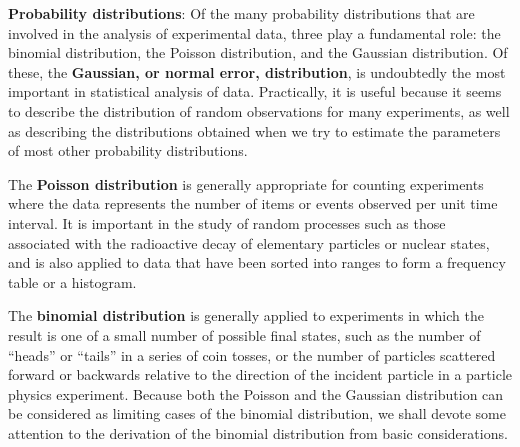 \documentclass[a4paper,10pt]{article}
\begin{document}
{\noindent}\textbf{Probability distributions}: Of the many probability distributions that are involved in the analysis of experimental data, three play a fundamental role: the binomial distribution, the Poisson distribution, and the Gaussian distribution. Of these, the \textbf{Gaussian, or normal error, distribution}, is undoubtedly the most important in statistical analysis of data. Practically, it is useful because it seems to describe the distribution of random observations for many experiments, as well as describing the distributions obtained when we try to estimate the parameters of most other probability distributions. 

{\noindent}The \textbf{Poisson distribution} is generally appropriate for counting experiments where the data represents the number of items or events observed per unit time interval. It is important in the study of random processes such as those associated with the radioactive decay of elementary particles or nuclear states, and is also applied to data that have been sorted into ranges to form a frequency table or a histogram. 

{\noindent}The \textbf{binomial distribution} is generally applied to experiments in which the result is one of a small number of possible final states, such as the number of ``heads'' or ``tails'' in a series of coin tosses, or the number of particles scattered forward or backwards relative to the direction of the incident particle in a particle physics experiment. Because both the Poisson and the Gaussian distribution can be considered as limiting cases of the binomial distribution, we shall devote some attention to the derivation of the binomial distribution from basic considerations.
\end{document}
